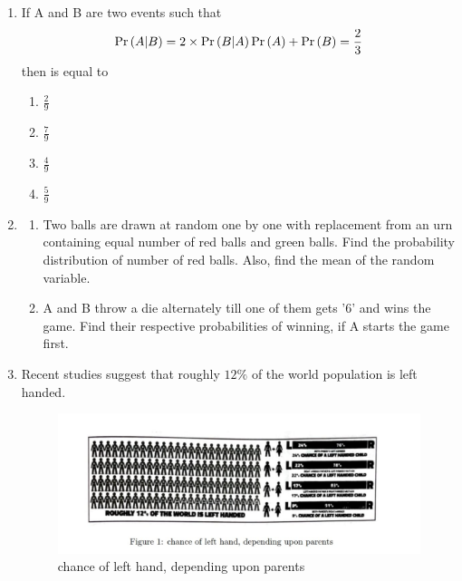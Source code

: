 \begin{enumerate}
	
	\item If A and B are two events such that 
		\begin{align}
			\Pr\left(A|B\right) = 2 \times  \Pr\left(B|A\right)\Pr\left(A\right) + \Pr\left(B\right)  = \frac{2}{3}
		\end{align}then   is equal to
\begin{enumerate}
\item $\frac{2}{9}$
\item $\frac{7}{9}$
\item $\frac{4}{9}$
\item $\frac{5}{9}$
\end{enumerate}

\item
\begin{enumerate}
\item Two balls are drawn at random one by one with replacement from an urn containing equal number of red balls and green balls. Find the probability distribution of number of red balls. Also, find the mean of the random variable.
\item A and B throw a die alternately till one of them gets '6' and wins the game. Find their respective probabilities of winning, if A starts the game first.
\end{enumerate}

\item Recent studies suggest that roughly $12\%$ of the world population is left handed.
	
\begin{figure}[h!]
\centering
\includegraphics[width=\columnwidth]{figs/left.png}
\caption{chance of left hand, depending upon parents}
\label{fig:left.png}
\end{figure}


\end{enumerate}
